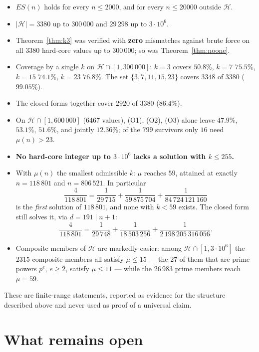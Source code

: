 \documentclass[11pt,a4paper]{article}
\theoremstyle{definition}
\begin{document}
\begin{itemize}
\item $ES(n)$ holds for every $n\le 2000$, and for every $n\le 20000$ outside
  $\mathcal H$.
\item $\lvert\mathcal H\rvert=3380$ up to $300\,000$ and $29\,298$ up to
  $3\cdot 10^{6}$.
\item Theorem~\ref{thm:k3} was verified with \textbf{zero} mismatches against
  brute force on all $3380$ hard-core values up to $300\,000$; so was
  Theorem~\ref{thm:noone}.
\item Coverage by a single $k$ on $\mathcal H\cap[1,300\,000]$:
  $k=3$ covers $50.8\%$, $k=7$ $75.5\%$, $k=15$ $74.1\%$, $k=23$ $76.8\%$.
  The set $\{3,7,11,15,23\}$ covers $3348$ of $3380$ ($99.05\%$).
\item The closed forms together cover $2920$ of $3380$ ($86.4\%$).
\item On $\mathcal H\cap[1,600\,000]$ ($6467$ values), (O1), (O2), (O3) alone
  leave $47.9\%$, $53.1\%$, $51.6\%$, and jointly \textbf{$12.36\%$}; of the
  $799$ survivors only $16$ need $\mu(n)>23$.
\item \textbf{No hard-core integer up to $3\cdot 10^{6}$ lacks a solution with
  $k\le 255$.}
\item With $\mu(n)$ the smallest admissible $k$: $\mu$ reaches $59$, attained at
  exactly $n=118\,801$ and $n=806\,521$. In particular
  \[
    \frac{4}{118\,801}=\frac1{29\,715}+\frac1{59\,875\,704}
                       +\frac1{84\,724\,121\,160}
  \]
  is the \emph{first} solution of $118\,801$, and none with $k<59$ exists. The
  closed form still solves it, via $d=191\mid n+1$:
  \[
    \frac{4}{118\,801}=\frac1{29\,748}+\frac1{18\,503\,256}
                       +\frac1{2\,198\,205\,316\,056}.
  \]
\item Composite members of $\mathcal H$ are markedly easier: among
  $\mathcal H\cap[1,3\cdot 10^{6}]$ the $2315$ composite members all satisfy
  $\mu\le 15$ --- the $27$ of them that are prime powers $p^{e}$, $e\ge 2$,
  satisfy $\mu\le 11$ --- while the $26\,983$ prime members reach $\mu=59$.
\end{itemize}

These are finite-range statements, reported as evidence for the structure
described above and never used as proof of a universal claim.

\section{What remains open}
\end{document}
